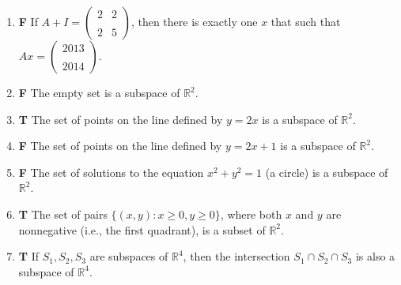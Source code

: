 \documentclass[11pt]{article}
\newcommand{\tf}[2]{\item {\bf {\color{blue}#1}}\hspace{1em} #2}
\begin{document}
\begin{enumerate}
\tf{F}{If $A+I=\left(\begin{array}{rr}
2 & 2 \\\\
2 & 5
\end{array}\right)$, then there is exactly one $x$ that such that $Ax = \left(\begin{array}{r}2013 \\\\2014\end{array}\right)$.}

\tf{F}{The empty set is a subspace of $\mathbb{R}^2$.}

\tf{T}{The set of points on the line defined by $y = 2x$ is a subspace of $\mathbb{R}^2$.}

\tf{F}{The set of points on the line defined by $y = 2x + 1$ is a subspace of $\mathbb{R}^2$.}

\tf{F}{The set of solutions to the equation $x^2 + y^2 = 1$ (a circle) is a subspace of $\mathbb{R}^2$.}

\tf{T}{The set of pairs $\{(x,y): x\geq 0, y\geq 0\}$, where both $x$ and $y$ are nonnegative (i.e., the first quadrant), is a subset of $\mathbb{R}^2$.}

\tf{T}{If $S_1, S_2, S_3$ are subspaces of $\mathbb{R}^4$, then the intersection $S_1\cap S_2 \cap S_3$ is also a subspace of $\mathbb{R}^4$.}

\end{enumerate}
\end{document}
